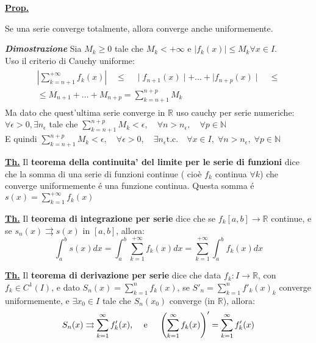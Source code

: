 \documentclass[a4paper,10pt]{article} %
\renewcommand{\b}[1]{%
    {\textbf{#1}}}
\newcommand{\lprop}[1]{%
    {\smallbreak\par\normalsize\textbf{\underline{Prop.}} {#1} \smallbreak}}
\newcommand{\ltheorem}[1]{%
    {\smallbreak\par\normalsize\textbf{\underline{Th.}} {#1} \smallbreak\par}}
\newcommand{\ldim}[1]{%
    {\smallbreak\par\scriptsize\emph{\textbf{Dimostrazione}} {#1} \par}}
\begin{document}
\begin{multicols}{2}
\lprop{
    Se una serie converge totalmente, allora converge anche uniformemente.
    \ldim{
        Sia $ M_k \geq 0$ tale che $ M_k < + \infty$ e $\mid f_k(x) \mid \leq M_k \forall x \in I$. \\
        Uso il criterio di Cauchy uniforme:
        \begin{gather}
        \begin{split}
            \left| \sum_{k=n+1}^{+\infty} f_k(x) \right| \quad \leq \quad \mid f_{n+1}(x) \mid + \dots + \mid f_{n+p}(x) \mid \quad \leq \\
            \leq M_{n+1} + \dots + M_{n+p} = \sum_{k=n+1}^{n+p} M_k
        \end{split}
        \end{gather}
        Ma dato che quest'ultima serie converge in $\mathbb{R}$ uso cauchy per serie numeriche: $\forall \epsilon > 0,  \exists n_\epsilon$ tale che $\displaystyle \sum_{k=n+1}^{n+p} M_k < \epsilon, \quad \forall n > n_\epsilon, \quad \forall p \in \mathbb{N}$\\
        E quindi $\displaystyle \sum_{k=n+1}^{n+p} M_k < \epsilon, \quad  \forall \epsilon > 0, \quad \exists n_\epsilon \text{t.c.} \quad \forall x \in I, \; \forall n > n_\epsilon, \; \forall p \in \mathbb{N}$
    }
}

\ltheorem{
    Il \b{teorema della continuita' del limite per le serie di funzioni} dice che la somma di una serie di funzioni continue ( cio\`{e} $f_k$ continua $\forall k$) che converge uniformemente \'{e} una funzione continua. Questa somma \'{e} $ s(x) = \sum_{k=1}^{+\infty} f_k(x) $
}

\ltheorem{
    Il \b{teorema di integrazione per serie} dice che se
    $ f_k [a,b] \rightarrow \mathbb{R} $ continue, e se $ s_n(x) \rightrightarrows s(x) \text{ in } \left[a,b\right] $, allora:
    $$ \int_a^b s(x)dx = \int_a^b \sum_{k=1}^{+\infty} f_k(x) dx = \sum_{k=1}^{+\infty} \int_a^b f_k(x) dx $$
}

\ltheorem{
    Il \b{teorema di derivazione per serie} dice che data $f_k : I \rightarrow \mathbb{R}$, con
    $ f_k \in C^1(I)$, e dato $S_n(x) = \sum_{k=1}^n f_k(x)$, se $S'_n = \sum_{k=1}^n f'_k(x)_k$
    converge uniformemente, e $ \exists x_0 \in I $ tale che $ S_n(x_0) $ converge (in 
    $\mathbb{R}$), allora: 
    $$
    S_n(x) \rightrightarrows \sum_{k=1}^\infty f'_k(x)  \text{, \quad e \quad }
    \left( \sum_{k=1}^\infty f_k(x) \right)' = \sum_{k=1}^\infty f'_k(x)
    $$
}


\end{multicols}
\end{document}
